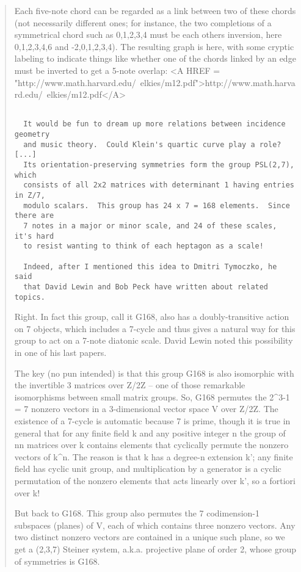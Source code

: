 \begin{quote}
Each five-note chord can be regarded as a link between two
of these chords (not necessarily different ones; for instance,
the two completions of a symmetrical chord such as {0,1,2,3,4}
must be each others inversion, here {0,1,2,3,4,6} and {-2,0,1,2,3,4}).
The resulting graph is here, with some cryptic labeling to indicate
things like whether one of the chords linked by an edge must be inverted
to get a 5-note overlap:
<A HREF = "http://www.math.harvard.edu/~elkies/m12.pdf">http://www.math.harvard.edu/~elkies/m12.pdf</A>


\begin{verbatim}

  It would be fun to dream up more relations between incidence geometry
  and music theory.  Could Klein's quartic curve play a role? [...]
  Its orientation-preserving symmetries form the group PSL(2,7), which
  consists of all 2x2 matrices with determinant 1 having entries in Z/7,
  modulo scalars.  This group has 24 x 7 = 168 elements.  Since there are
  7 notes in a major or minor scale, and 24 of these scales, it's hard
  to resist wanting to think of each heptagon as a scale!
 
  Indeed, after I mentioned this idea to Dmitri Tymoczko, he said
  that David Lewin and Bob Peck have written about related topics.
\end{verbatim}
    

Right.  In fact this group, call it G168, also has
a doubly-transitive action on 7 objects, which includes
a 7-cycle and thus gives a natural way for this group
to act on a 7-note diatonic scale.  David Lewin noted
this possibility in one of his last papers.

The key (no pun intended) is that this group G168 is also
isomorphic with the invertible 3 matrices over Z/2Z --
one of those remarkable isomorphisms between small matrix groups.
So, G168 permutes the 2^{3}-1 = 7 nonzero vectors in a 3-dimensional
vector space V over Z/2Z.  The existence of a 7-cycle is automatic
because 7 is prime, though it is true in general that for any
finite field k and any positive integer n the group of n\times n matrices
over k contains elements that cyclically permute the nonzero vectors
of k^{n}.  The reason is that k has a degree-n extension k'; any finite
field has cyclic unit group, and multiplication by a generator is
a cyclic permutation of the nonzero elements that acts linearly over k',
so a fortiori over k!

But back to G168.  This group also permutes the 7 codimension-1
subspaces (planes) of V, each of which contains three nonzero vectors.
Any two distinct nonzero vectors are contained in a unique such plane,
so we get a (2,3,7) Steiner system, a.k.a. projective plane of order 2,
whose group of symmetries is G168.


\end{quote}
